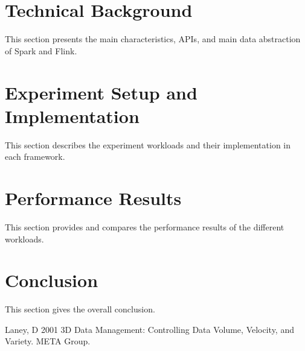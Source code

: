 \documentclass[]{article}
\begin{document}
\section{Technical Background}
This section presents the main characteristics, APIs, and main data abstraction of Spark and Flink.

\section{Experiment Setup and Implementation}
This section describes the experiment workloads and their implementation in each framework.
\section{Performance Results}

This section provides and compares the performance results of the different workloads.

\section{Conclusion}
This section gives the overall conclusion.


\begin{thebibliography}{[MT1]}
%
Laney, D 2001 3D Data Management: Controlling Data Volume, Velocity, and Variety. META Group.

%
\end{thebibliography}
\end{document}
